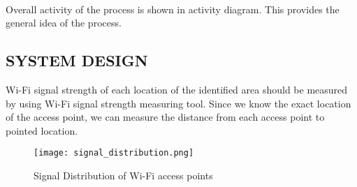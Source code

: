 \paragraph{}
Overall activity of the process is shown in activity diagram. This provides the general idea of the process. 

\newpage
\subsection{SYSTEM DESIGN}
Wi-Fi signal strength of each location of the identified area should be measured by using Wi-Fi signal strength measuring tool.
Since we know the exact location of the access point, we can measure the distance from each access point to pointed location.

\begin{figure}[h]	
	\centering
	\texttt{[image: signal\_distribution.png]}
	\caption{Signal Distribution of Wi-Fi access points}
\end{figure}

